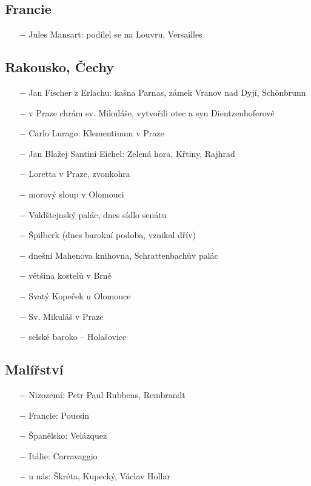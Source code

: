 \documentclass{article}
\begin{document}
\subsection*{Francie}
\begin{itemize}
    \vspace{-0.5em}
    \setlength\itemsep{0.15em}
  \item[$-$] Jules Mansart: podílel se na Louvru, Versailles
  \end{itemize}

\subsection*{Rakousko, Čechy}
\begin{itemize}
    \vspace{-0.5em}
    \setlength\itemsep{0.15em}
  \item[$-$] Jan Fischer z Erlachu: kašna Parnas, zámek Vranov nad Dyjí, Schönbrunn
  \item[$-$] v Praze chrám sv. Mikuláše, vytvořili otec a syn Dientzenhoferové
  \item[$-$] Carlo Lurago: Klementinum v Praze
  \item[$-$] Jan Blažej Santini Eichel: Zelená hora, Křtiny, Rajhrad
  \item[$-$] Loretta v Praze, zvonkohra
  \item[$-$] morový sloup v Olomouci
  \item[$-$] Valdštejnský palác, dnes sídlo senátu
  \item[$-$] Špilberk (dnes barokní podoba, vznikal dřív)
  \item[$-$] dnešní Mahenova knihovna, Schrattenbachův palác
  \item[$-$] většina kostelů v Brně
  \item[$-$] Svatý Kopeček u Olomouce
  \item[$-$] Sv. Mikuláš v Praze
  \item[$-$] selské baroko – Holašovice

\end{itemize}

\subsection*{Malířství}
\begin{itemize}
    \vspace{-0.5em}
    \setlength\itemsep{0.15em}
    \item[$-$] Nizozemí: Petr Paul Rubbens, Rembrandt
  \item[$-$] Francie: Poussin
  \item[$-$] Španělsko: Velázquez
  \item[$-$] Itálie: Carravaggio
  \item[$-$] u nás: Škréta, Kupecký, Václav Hollar

\end{itemize}
\end{document}
